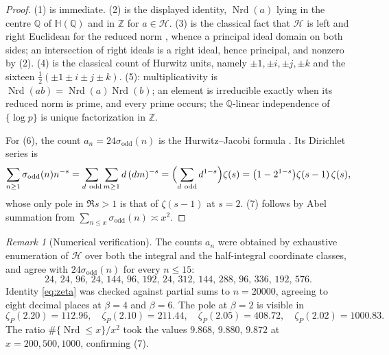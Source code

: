 \documentclass[11pt]{amsart}
\numberwithin{equation}{section}
\theoremstyle{definition}
\theoremstyle{remark}
\newtheorem{remark}[theorem]{Remark}
\newcommand{\Z}{\mathbb{Z}}
\newcommand{\Q}{\mathbb{Q}}
\newcommand{\HH}{\mathbb{H}}
\newcommand{\cH}{\mathcal{H}}
\newcommand{\Nrd}{\operatorname{Nrd}}
\begin{document}
\begin{proof}
(1) is immediate. (2) is the displayed identity, $\Nrd(a)$ lying in the centre $\Q$ of
$\HH(\Q)$ and in $\Z$ for $a\in\cH$. (3) is the classical fact that $\cH$ is left and right
Euclidean for the reduced norm \cite{Hurwitz}, whence a principal ideal domain on both
sides; an intersection of right ideals is a right ideal, hence principal, and nonzero by (2). (4) is the classical
count of Hurwitz units, namely $\pm1,\pm i,\pm j,\pm k$ and the sixteen
$\tfrac12(\pm1\pm i\pm j\pm k)$. (5): multiplicativity is $\Nrd(ab)=\Nrd(a)\Nrd(b)$; an
element is irreducible exactly when its reduced norm is prime, and every prime occurs; the
$\Q$-linear independence of $\{\log p\}$ is unique factorization in $\Z$.

For (6), the count $a_n=24\sigma_{\mathrm{odd}}(n)$ is the Hurwitz--Jacobi formula
\cite{Hurwitz}. Its
Dirichlet series is
\[
\sum_{n\ge1}\sigma_{\mathrm{odd}}(n)n^{-s}
=\sum_{d\ \mathrm{odd}}\sum_{m\ge1}d\,(dm)^{-s}
=\Bigl(\sum_{d\ \mathrm{odd}}d^{1-s}\Bigr)\zeta(s)
=\bigl(1-2^{1-s}\bigr)\zeta(s-1)\,\zeta(s),
\]
whose only pole in $\Re s>1$ is that of $\zeta(s-1)$ at $s=2$. (7) follows by Abel summation
from $\sum_{n\le x}\sigma_{\mathrm{odd}}(n)\asymp x^2$.
\end{proof}

\begin{remark}[Numerical verification]\label{rem:num}
The counts $a_n$ were obtained by exhaustive enumeration of $\cH$ over both the integral and
the half-integral coordinate classes, and agree with $24\sigma_{\mathrm{odd}}(n)$ for every
$n\le15$:
\[
24,\,24,\,96,\,24,\,144,\,96,\,192,\,24,\,312,\,144,\,288,\,96,\,336,\,192,\,576 .
\]
Identity \eqref{eq:zeta} was checked against partial sums to $n=20000$, agreeing to eight
decimal places at $\beta=4$ and $\beta=6$. The pole at $\beta=2$ is visible in
\[
\zeta_P(2.20)=112.96,\quad \zeta_P(2.10)=211.44,\quad \zeta_P(2.05)=408.72,\quad \zeta_P(2.02)=1000.83 .
\]
The ratio $\#\{\Nrd\le x\}/x^2$ took the values $9.868$, $9.880$, $9.872$ at
$x=200,500,1000$, confirming (7).
\end{remark}
\end{document}
